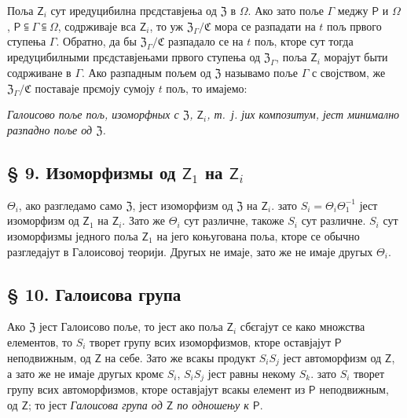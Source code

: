 \documentclass[11pt]{article}
\begin{document}
Поља \(\mathsf{Z}_i\) сут иредуцибилна прєдставјења од \(\mathfrak Z\) в \(\Omega\). Ако зато поље \(\Gamma\) меджу \(\mathsf P\) и \(\Omega\), \(\mathsf P\subseteqq\Gamma\subseteqq\Omega\), содрживаје вса \(\mathsf{Z}_i\), то уж \(\mathfrak Z_\Gamma/\mathfrak C\) мора се разпадати на \(t\) пољ првого ступења \(\Gamma\). Обратно, да бы \(\mathfrak Z_\Gamma/\mathfrak C\) разпадало се на \(t\) пољ, кторе сут тогда иредуцибилными прєдставјењами првого ступења од \(\mathfrak Z_\Gamma\), поља \(\mathsf{Z}_i\) морајут быти содрживане в \(\Gamma\). Ако разпадным пољем од \(\mathfrak Z\) называмо поље \(\Gamma\) с својством, же \(\mathfrak Z_\Gamma/\mathfrak C\) поставаје прємоју сумоју \(t\) пољ, то имајемо:

\emph{Галоисово поље пољ, изоморфных с \(\mathfrak Z\), \(\mathsf{Z}_i\), т.~ј. јих композитум, јест минимално разпадно поље од \(\mathfrak Z\).}

\subsection*{§ 9. Изоморфизмы од \(\mathsf{Z}_1\) на \(\mathsf{Z}_i\)}\label{die-isomorphismen-von-z1-auf-die-zi}

\(\Theta_i\), ако разгледамо само \(\mathfrak Z\), јест изоморфизм од \(\mathfrak Z\) на \(\mathsf{Z}_i\). зато \(S_i=\Theta_i\Theta_1^{-1}\) јест изоморфизм од \(\mathsf{Z}_1\) на \(\mathsf{Z}_i\). Зато же \(\Theta_i\) сут различне, такоже \(S_i\) сут различне. \(S_i\) сут изоморфизмы једного поља \(\mathsf{Z}_1\) на јего коњугована поља, кторе се обычно разгледајут в Галоисовој теорији. Другых не имаје, зато же не имаје другых \(\Theta_i\).

\subsection*{§ 10. Галоисова група}\label{die-galoissche-gruppe}

Ако \(\mathfrak Z\) јест Галоисово поље, то јест ако поља \(\mathsf{Z}_i\) сбєгајут се како множства елементов, то \(S_i\) творет групу всих изоморфизмов, кторе оставјајут \(\mathsf P\) неподвижным, од \(\mathsf{Z}\) на себе. Зато же всакы продукт \(S_iS_j\) јест автоморфизм од \(\mathsf{Z}\), а зато же не имаје другых кромє \(S_i\), \(S_iS_j\) јест равны некому \(S_k\). зато \(S_i\) творет групу всих автоморфизмов, кторе оставјајут всакы елемент из \(\mathsf P\) неподвижным, од \(\mathsf{Z}\); то јест \emph{Галоисова група од \(\mathsf{Z}\) по одношењу к \(\mathsf P\)}.
\end{document}
